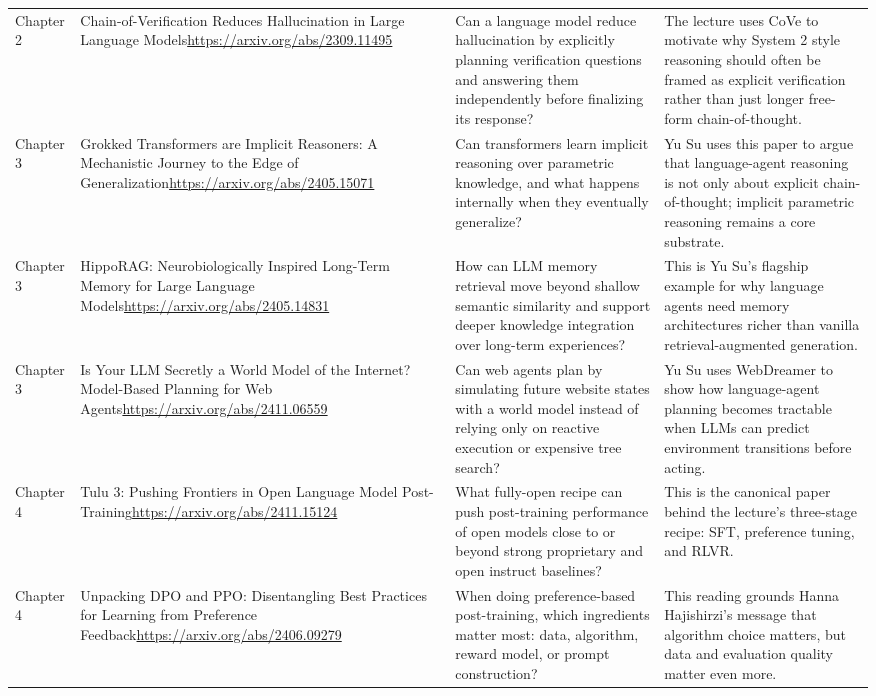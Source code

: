 \begin{longtable}{p{}p{}p{}p{}}
Chapter 2 & Chain-of-Verification Reduces Hallucination in Large Language Models\newline\url{https://arxiv.org/abs/2309.11495} & Can a language model reduce hallucination by explicitly planning verification questions and answering them independently before finalizing its response? & The lecture uses CoVe to motivate why System 2 style reasoning should often be framed as explicit verification rather than just longer free-form chain-of-thought. \\
Chapter 3 & Grokked Transformers are Implicit Reasoners: A Mechanistic Journey to the Edge of Generalization\newline\url{https://arxiv.org/abs/2405.15071} & Can transformers learn implicit reasoning over parametric knowledge, and what happens internally when they eventually generalize? & Yu Su uses this paper to argue that language-agent reasoning is not only about explicit chain-of-thought; implicit parametric reasoning remains a core substrate. \\
Chapter 3 & HippoRAG: Neurobiologically Inspired Long-Term Memory for Large Language Models\newline\url{https://arxiv.org/abs/2405.14831} & How can LLM memory retrieval move beyond shallow semantic similarity and support deeper knowledge integration over long-term experiences? & This is Yu Su's flagship example for why language agents need memory architectures richer than vanilla retrieval-augmented generation. \\
Chapter 3 & Is Your LLM Secretly a World Model of the Internet? Model-Based Planning for Web Agents\newline\url{https://arxiv.org/abs/2411.06559} & Can web agents plan by simulating future website states with a world model instead of relying only on reactive execution or expensive tree search? & Yu Su uses WebDreamer to show how language-agent planning becomes tractable when LLMs can predict environment transitions before acting. \\
Chapter 4 & Tulu 3: Pushing Frontiers in Open Language Model Post-Training\newline\url{https://arxiv.org/abs/2411.15124} & What fully-open recipe can push post-training performance of open models close to or beyond strong proprietary and open instruct baselines? & This is the canonical paper behind the lecture's three-stage recipe: SFT, preference tuning, and RLVR. \\
Chapter 4 & Unpacking DPO and PPO: Disentangling Best Practices for Learning from Preference Feedback\newline\url{https://arxiv.org/abs/2406.09279} & When doing preference-based post-training, which ingredients matter most: data, algorithm, reward model, or prompt construction? & This reading grounds Hanna Hajishirzi's message that algorithm choice matters, but data and evaluation quality matter even more. \\

\end{longtable}
